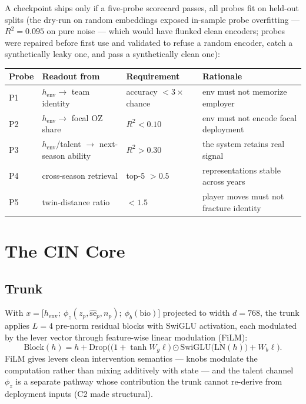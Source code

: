 \documentclass[11pt]{article}
\newcommand{\henv}{h_{\mathrm{env}}}
\begin{document}
A checkpoint ships only if a five-probe scorecard passes, all probes fit on held-out splits
(the dry-run on random embeddings exposed in-sample probe overfitting --- $R^2 = 0.095$ on
pure noise --- which would have flunked clean encoders; probes were repaired before first
use and validated to refuse a random encoder, catch a synthetically leaky one, and pass a
synthetically clean one):
\begin{center}
\begin{tabular}{@{}llll@{}}
\toprule
Probe & Readout from & Requirement & Rationale \\
\midrule
P1 & $\henv \to$ team identity & accuracy $< 3\times$ chance & env must not memorize employer \\
P2 & $\henv \to$ focal OZ share & $R^2 < 0.10$ & env must not encode focal deployment \\
P3 & $\henv$/talent $\to$ next-season ability & $R^2 > 0.30$ & the system retains real signal \\
P4 & cross-season retrieval & top-5 $> 0.5$ & representations stable across years \\
P5 & twin-distance ratio & $< 1.5$ & player moves must not fracture identity \\
\bottomrule
\end{tabular}
\end{center}

\section{The CIN Core}\label{sec:core}

\subsection{Trunk}

With $x = \big[\henv;\ \phi_z(z_p, \widehat{\mathrm{se}}_p, n_p);\ \phi_b(\mathrm{bio})\big]$
projected to width $d{=}768$, the trunk applies $L{=}4$ pre-norm residual blocks with
SwiGLU activation, each modulated by the lever vector through feature-wise linear
modulation (FiLM):
\begin{equation}
\mathrm{Block}(h) = h + \mathrm{Drop}\Big(
\big(1 + \tanh W_g \ell\big) \odot \mathrm{SwiGLU}\big(\mathrm{LN}(h)\big) + W_b \ell \Big).
\end{equation}
FiLM gives levers clean intervention semantics --- knobs modulate the computation rather
than mixing additively with state --- and the talent channel $\phi_z$ is a separate pathway
whose contribution the trunk cannot re-derive from deployment inputs (C2 made structural).
\end{document}
